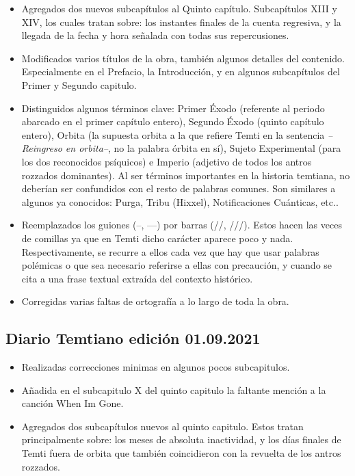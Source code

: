 \documentclass[
  spanish,
]{book}
\begin{document}
\begin{itemize}
\item
  Agregados dos nuevos subcapítulos al Quinto capítulo. Subcapítulos XIII y XIV, los cuales tratan sobre: los instantes finales de la cuenta regresiva, y la llegada de la fecha y hora señalada con todas sus repercusiones.
\item
  Modificados varios títulos de la obra, también algunos detalles del contenido. Especialmente en el Prefacio, la Introducción, y en algunos subcapítulos del Primer y Segundo capitulo.
\item
  Distinguidos algunos términos clave: Primer Éxodo (referente al periodo abarcado en el primer capítulo entero), Segundo Éxodo (quinto capítulo entero), Orbita (la supuesta orbita a la que refiere Temti en la sentencia \emph{--Reingreso en orbita--}, no la palabra órbita en sí), Sujeto Experimental (para los dos reconocidos psíquicos) e Imperio (adjetivo de todos los antros rozzados dominantes). Al ser términos importantes en la historia temtiana, no deberían ser confundidos con el resto de palabras comunes. Son similares a algunos ya conocidos: Purga, Tribu (Hixxel), Notificaciones Cuánticas, etc..
\item
  Reemplazados los guiones (--, ---) por barras (//, ///). Estos hacen las veces de comillas ya que en Temti dicho carácter aparece poco y nada. Respectivamente, se recurre a ellos cada vez que hay que usar palabras polémicas o que sea necesario referirse a ellas con precaución, y cuando se cita a una frase textual extraída del contexto histórico.
\item
  Corregidas varias faltas de ortografía a lo largo de toda la obra.
\end{itemize}

\hypertarget{diario-temtiano-ediciuxf3n-01.09.2021}{%
\subsection*{Diario Temtiano edición 01.09.2021}\label{diario-temtiano-ediciuxf3n-01.09.2021}}

\begin{itemize}
\item
  Realizadas correcciones minimas en algunos pocos subcapitulos.
\item
  Añadida en el subcapitulo X del quinto capitulo la faltante mención a la canción When Im Gone.
\item
  Agregados dos subcapítulos nuevos al quinto capitulo. Estos tratan principalmente sobre: los meses de absoluta inactividad, y los días finales de Temti fuera de orbita que también coincidieron con la revuelta de los antros rozzados.
\end{itemize}
\end{document}
